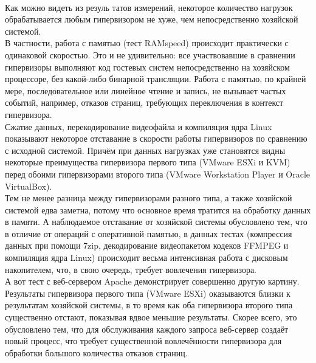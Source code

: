 \documentclass[14pt, a4paper]{article}
\begin{document}
\newpage

\begin{figure}[h]
    \centering
    \\
    \label{framework} 
\end{figure}


Как можно видеть из резуль татов измерений, некоторое количество нагрузок обрабатывается любым
гипервизором не хуже, чем непосредственно хозяйской системой.\\

В частности, работа с памятью (тест RAMspeed) происходит практически с одинаковой скоростью. Это
и не удивительно: все участвовавшие в сравнении гипервизоры выполняют код гостевых систем
непосредственно на хозяйском процессоре, без какой-либо бинарной трансляции. Работа с памятью,
по крайней мере, последовательное или линейное чтение и запись, не вызывает частых событий,
например, отказов страниц, требующих переключения в контекст гипервизора.\\

Сжатие данных, перекодирование видеофайла и компиляция ядра Linux показывают некоторое
отставание в скорости работы гипервизоров по сравнению с исходной системой. Причём при данных
нагрузках уже становятся видны некоторые преимущества гипервизора первого типа (VMware ESXi и
KVM) перед обоими гипервизорами второго типа (VMware Workstation Player и Oracle VirtualBox).\\

Тем не менее разница между гипервизорами разного типа, а также хозяйской системой едва заметна,
потому что основное время тратится на обработку данных в памяти. А наблюдаемое отставание от
хозяйской системы обусловлено тем, что в отличие от операций с оперативной памятью, в данных
тестах (компрессия данных при помощи 7zip, декодирование видеопакетом кодеков FFMPEG и
компиляция ядра Linux) происходит весьма интенсивная работа с дисковым накопителем, что, в свою
очередь, требует вовлечения гипервизора.\\

А вот тест с веб-сервером Apache демонстрирует совершенно другую картину. Результаты
гипервизора первого типа (VMware ESXi) оказываются близки к результатам хозяйской системы, в то
время как оба гипервизора второго типа существенно отстают, показывая вдвое меньшие результаты.
Скорее всего, это обусловлено тем, что для обслуживания каждого запроса веб-сервер создаёт новый 
процесс, что требует существенной вовлечённости гипервизора для обработки большого количества
отказов страниц.\\
\end{document}
